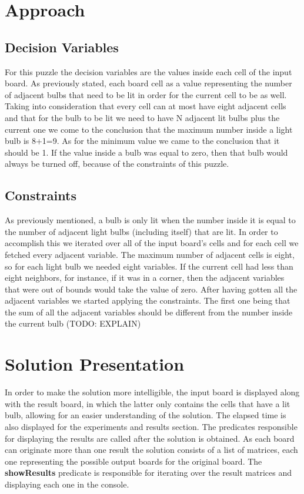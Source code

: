 \documentclass[runningheads]{llncs}
\begin{document}
\section{Approach}

\subsection{Decision Variables}
For this puzzle the decision variables are the values inside each cell of the input board. As previously stated, each board cell as a value representing the number of adjacent bulbs that need to be lit in order for the current cell to be as well.
Taking into consideration that every cell can at most have eight adjacent cells and that for the bulb to be lit we need to have N adjacent lit bulbs plus the current one we come to the conclusion that the maximum number inside a light bulb is 8+1=9. As for the minimum value we came to the conclusion that it should be 1. If the value inside a bulb was equal to zero, then that bulb would always be turned off, because of the constraints of this puzzle.

\subsection{Constraints}
As previously mentioned, a bulb is only lit when the number inside it is equal to the number of adjacent light bulbs (including itself) that are lit. In order to accomplish this we iterated over all of the input board's cells and for each cell we fetched every adjacent variable. The maximum number of adjacent cells is eight, so for each light bulb we needed eight variables. If the current cell had less than eight neighbors, for instance, if it was in a corner, then the adjacent variables that were out of bounds would take the value of zero.
After having gotten all the adjacent variables we started applying the constraints. The first one being that the sum of all the adjacent variables should be different from the number inside the current bulb 
(TODO: EXPLAIN)

\clearpage
\section{Solution Presentation}
In order to make the solution more intelligible, the input board is displayed along with the result board, in which the latter
only contains the cells that have a lit bulb, allowing for an easier understanding of the solution. The elapsed time is also displayed for the experiments and results section.
The predicates responsible for displaying the results are called after the solution is obtained. As each board can originate more than one result the solution consists of a list of matrices, each one representing the possible output boards for the original board. The \textbf{showResults} predicate is responsible for iterating over the result matrices and displaying each one in the console.
\end{document}
